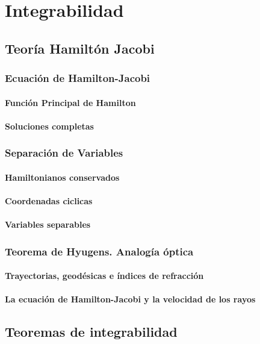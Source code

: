 \setchapterpreamble[u]{\margintoc}
\chapter{Integrabilidad}


\section{Teoría Hamiltón Jacobi}
\subsection{Ecuación de Hamilton-Jacobi}
\subsubsection{Función Principal de Hamilton}
\subsubsection{Soluciones completas}
\subsection{Separación de Variables}
\subsubsection{Hamiltonianos conservados}
\subsubsection{Coordenadas ciclicas}
\subsubsection{Variables separables}
\subsection{Teorema de Hyugens. Analogía óptica}
\subsubsection{Trayectorias, geodésicas e índices de refracción}
\subsubsection{La ecuación de Hamilton-Jacobi y la velocidad de
los rayos}
\section{Teoremas de integrabilidad}
